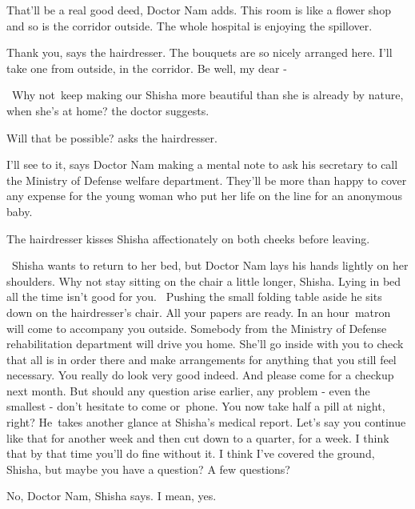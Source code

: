 \documentclass[letterpaper]{article}
\begin{document}
{\textquotedbl}That'll be a real good deed,{\textquotedbl} Doctor Nam adds. {\textquotedbl}This room is like a flower
shop and so is the corridor outside. The whole hospital is enjoying the spillover.{\textquotedbl}

{\textquotedbl}Thank you,{\textquotedbl} says the hairdresser. {\textquotedbl}The bouquets are so nicely arranged here.
I'll take one from outside, in the corridor. Be well, my dear -{\textquotedbl} 

~{\textquotedbl}Why not~keep making our Shisha more beautiful than she is already by nature, when she's at
home?{\textquotedbl} the doctor suggests. 

{\textquotedbl}Will that be possible?{\textquotedbl} asks the hairdresser. 

{\textquotedbl}I'll see to it,{\textquotedbl} says Doctor Nam making a mental note to ask his secretary to call the
Ministry of Defense welfare department. They'll be more than happy to cover any expense for the young woman who put her
life on the line for an anonymous baby.

The hairdresser kisses Shisha affectionately on both cheeks before leaving.

~Shisha wants to return to her bed, but Doctor Nam lays his hands lightly on her shoulders. {\textquotedbl}Why not stay
sitting on the chair a little longer, Shisha. Lying in bed all the time isn't good for you.{\textquotedbl} \ Pushing
the small folding table aside he sits down on the hairdresser's chair. {\textquotedbl}All your papers are ready. In an
hour{~}matron will come to accompany you outside. Somebody from the Ministry of Defense rehabilitation
department will drive you home. She'll go inside with you to check that all is in order there and make arrangements for
anything that you still feel necessary. You really do look very good indeed. And please come for a checkup next month.
But should any question arise earlier, any problem - even the smallest - don't hesitate to come or~phone. You now take
half a pill at night, right?{\textquotedbl} He~takes another glance at Shisha's medical report. {\textquotedbl}Let's
say you continue like that for another week and then cut down to a quarter{,}
for a week. I think that by that time you'll do fine without it. I think I've covered the ground, Shisha, but maybe you
have a question? A few questions?{\textquotedbl} 

{\textquotedbl}No, Doctor Nam,{\textquotedbl} Shisha says. {\textquotedbl}I mean, yes.{\textquotedbl} 
\end{document}

